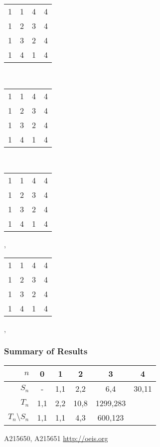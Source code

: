 \documentclass{beamer}
\newcommand{\jmp}{\vskip3pt}
\begin{document}
\begin{frame}
\begin{center}
\begin{tabular}{@{}c@{}c@{}c@{}c@{}}
1&\color{lgr}1&\color{lgr}4&4\\
\color{lgr}1&\color{lgr}2&\color{lgr}3&\color{lgr}4\\
\color{lgr}1&\color{lgr}3&\color{lgr}2&\color{lgr}4\\
1&\color{lgr}4&\color{lgr}1&4\\
\end{tabular}\\\jmp 
\begin{tabular}{@{}c@{}c@{}c@{}c@{}}
\color{lgr}1&\color{lgr}1&\color{lgr}4&\color{lgr}4\\
\color{lgr}1&2&\color{lgr}3&\color{lgr}4\\
\color{lgr}1&\color{lgr}3&\color{lgr}2&\color{lgr}4\\
\color{lgr}1&\color{lgr}4&\color{lgr}1&\color{lgr}4\\
\end{tabular}\ \ \ \ \ \ \ \ \ \ \ \ \ 
\begin{tabular}{@{}c@{}c@{}c@{}c@{}}
1&\color{lgr}1&\color{lgr}4&\color{lgr}4\\
\color{lgr}1&\color{lgr}2&\color{lgr}3&\color{lgr}4\\
\color{lgr}1&\color{lgr}3&\color{lgr}2&\color{lgr}4\\
\color{lgr}1&\color{lgr}4&\color{lgr}1&\color{lgr}4\\
\end{tabular},\ \ \ 
\begin{tabular}{@{}c@{}c@{}c@{}c@{}}
\color{lgr}1&\color{lgr}1&\color{lgr}4&\color{lgr}4\\
\color{lgr}1&\color{lgr}2&\color{lgr}3&\color{lgr}4\\
\color{lgr}1&\color{lgr}3&\color{lgr}2&\color{lgr}4\\
\color{lgr}1&\color{lgr}4&\color{lgr}1&4\\
\end{tabular},\ \ \ 


\end{center}
\end{frame}



\begin{frame}\frametitle{Summary of Results}
\begin{center}

\begin{tabular}{|r|c|c|c|c|c|}
\hline
$n$ & 0 & 1 & 2 & 3 & 4 \\
\hline
$S_n$ & - & 1,1 & 2,2 & 6,4 & 30,11\\
\hline
$T_n$ &1,1 & 2,2 & 10,8 & 1299,283 & \\
\hline
$T_n\setminus S_n$ & 1,1 & 1,1 & 4,3 & 600,123& \\
\hline
\end{tabular}
\end{center}
A215650, A215651 \url{http://oeis.org}
\end{frame}
\end{document}
